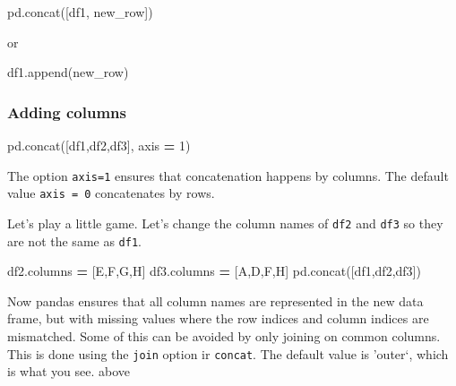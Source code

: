 \documentclass[
  letterpaper,
]{scrbook}
\newenvironment{Shaded}{\begin{snugshade}}{\end{snugshade}}
\newcommand{\DecValTok}[1]{\textcolor[rgb]{0.00,0.00,0.81}{#1}}
\newcommand{\NormalTok}[1]{#1}
\newcommand{\OperatorTok}[1]{\textcolor[rgb]{0.81,0.36,0.00}{\textbf{#1}}}
\newcommand{\StringTok}[1]{\textcolor[rgb]{0.31,0.60,0.02}{#1}}
\begin{document}
\begin{Shaded}
\begin{Highlighting}[]
\NormalTok{pd.concat([df1, new\_row])}
\end{Highlighting}
\end{Shaded}

or

\begin{Shaded}
\begin{Highlighting}[]
\NormalTok{df1.append(new\_row)}
\end{Highlighting}
\end{Shaded}

\hypertarget{adding-columns}{%
\subsubsection{Adding columns}\label{adding-columns}}

\begin{Shaded}
\begin{Highlighting}[]
\NormalTok{pd.concat([df1,df2,df3], axis }\OperatorTok{=} \DecValTok{1}\NormalTok{)}
\end{Highlighting}
\end{Shaded}

The option \texttt{axis=1} ensures that concatenation happens by columns. The default value \texttt{axis\ =\ 0} concatenates by rows.

Let's play a little game. Let's change the column names of \texttt{df2} and \texttt{df3} so they are not the same as \texttt{df1}.

\begin{Shaded}
\begin{Highlighting}[]
\NormalTok{df2.columns }\OperatorTok{=}\NormalTok{ [}\StringTok{\textquotesingle{}E\textquotesingle{}}\NormalTok{,}\StringTok{\textquotesingle{}F\textquotesingle{}}\NormalTok{,}\StringTok{\textquotesingle{}G\textquotesingle{}}\NormalTok{,}\StringTok{\textquotesingle{}H\textquotesingle{}}\NormalTok{]}
\NormalTok{df3.columns }\OperatorTok{=}\NormalTok{ [}\StringTok{\textquotesingle{}A\textquotesingle{}}\NormalTok{,}\StringTok{\textquotesingle{}D\textquotesingle{}}\NormalTok{,}\StringTok{\textquotesingle{}F\textquotesingle{}}\NormalTok{,}\StringTok{\textquotesingle{}H\textquotesingle{}}\NormalTok{]}
\NormalTok{pd.concat([df1,df2,df3])}
\end{Highlighting}
\end{Shaded}

Now pandas ensures that all column names are represented in the new data frame, but with missing values where the row indices and column indices are mismatched. Some of this can be avoided by only joining on common columns. This is done using the \texttt{join} option ir \texttt{concat}. The default value is 'outer`, which is what you see. above
\end{document}
